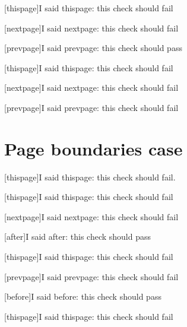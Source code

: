 \documentclass{book}
\begin{document}
\clearpage{}


[thispage]{I said thispage: this check should fail}

[nextpage]{I said nextpage: this check should fail}

[prevpage]{I said prevpage: this check should pass}

\clearpage{}

[thispage]{I said thispage: this check should fail}

[nextpage]{I said nextpage: this check should fail}

[prevpage]{I said prevpage: this check should fail}

\clearpage{}

\section{Page boundaries case}

\vspace{40\baselineskip}

[thispage]{I said thispage: this check should fail.
 \lipsum[6]}

\clearpage{}

[thispage]{I said thispage: this check should fail}

[nextpage]{I said nextpage: this check should fail}

[after]{I said after: this check should pass}

\vspace{40\baselineskip}


[thispage]{I said thispage: this check should fail}

[prevpage]{I said prevpage: this check should fail}

[before]{I said before: this check should pass}

\clearpage{}

[thispage]{I said thispage: this check should fail}
\end{document}
